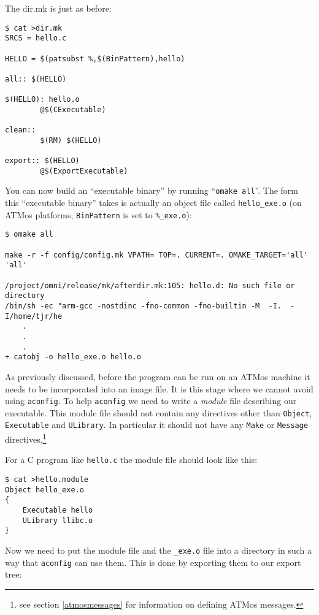 \documentclass[11pt,twoside,onecolumn]{article}
\begin{document}
The dir.mk is just as before:

{\footnotesize \begin{verbatim}
$ cat >dir.mk
SRCS = hello.c

HELLO = $(patsubst %,$(BinPattern),hello)

all:: $(HELLO)

$(HELLO): hello.o
        @$(CExecutable)

clean::
        $(RM) $(HELLO)

export:: $(HELLO)
        @$(ExportExecutable)
\end{verbatim}}

You can now build an ``executable binary'' by running ``{\tt omake all}''.  The
form this ``executable binary'' takes is actually an object file called
\verb|hello_exe.o| (on ATMos platforms, {\tt BinPattern} is set to
\verb|%_exe.o|):

{\footnotesize \begin{verbatim}
$ omake all

make -r -f config/config.mk VPATH= TOP=. CURRENT=. OMAKE_TARGET='all' 'all'

/project/omni/release/mk/afterdir.mk:105: hello.d: No such file or directory
/bin/sh -ec "arm-gcc -nostdinc -fno-common -fno-builtin -M  -I.  -I/home/tjr/he
    .
    .
    .
+ catobj -o hello_exe.o hello.o 
\end{verbatim}}

As previously discussed, before the program can be run on an ATMos machine it
needs to be incorporated into an image file.  It is this stage where we cannot
avoid using {\tt aconfig}.  To help {\tt aconfig} we need to write a {\em
module} file describing our executable.  This module file should not contain
any directives other than {\tt Object}, {\tt Executable} and {\tt ULibrary}.
In particular it should not have any {\tt Make} or {\tt Message}
directives.\footnote{see section \ref{atmosmessages} for information on
defining ATMos messages.}

For a C program like {\tt hello.c} the module file should look like this:

{\footnotesize \begin{verbatim}
$ cat >hello.module
Object hello_exe.o
{
    Executable hello
    ULibrary llibc.o
}
\end{verbatim}}

Now we need to put the module file and the \verb|_exe.o| file into a directory
in such a way that {\tt aconfig} can use them.  This is done by exporting them
to our export tree:
\end{document}
